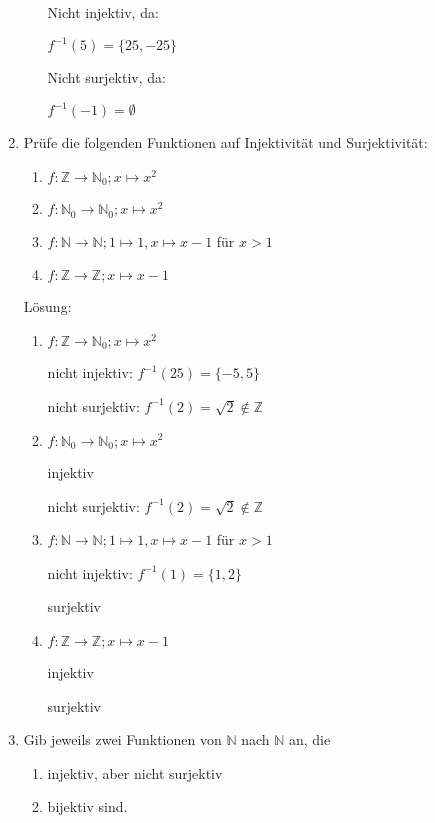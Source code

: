 \documentclass[main.tex]{subfiles}
\begin{document}
\begin{enumerate}
\begin{enumerate}
		            Nicht injektiv, da:

		            \( f^{-1}(5) = \{25, -25\} \)

		            Nicht surjektiv, da:

		            \( f^{-1}(-1) = \emptyset \)
	      \end{enumerate}
	\item Prüfe die folgenden Funktionen auf Injektivität und Surjektivität:
	      \begin{enumerate}
		      \item \( f: \mathbb{Z} \rightarrow \mathbb{N}_0 ; x \mapsto x^2 \)
		      \item \( f: \mathbb{N}_0 \rightarrow \mathbb{N}_0 ; x \mapsto x^2 \)
		      \item \( f: \mathbb{N} \rightarrow \mathbb{N}; 1 \mapsto 1, x \mapsto x - 1 \) für \( x > 1 \)
		      \item \( f: \mathbb{Z} \rightarrow \mathbb{Z}; x \mapsto x - 1 \)
	      \end{enumerate}

	      Lösung:
	      \begin{enumerate}
		      \item \( f: \mathbb{Z} \rightarrow \mathbb{N}_0 ; x \mapsto x^2 \)

		            nicht injektiv: \( f^{-1}(25) = \{-5, 5\} \)

		            nicht surjektiv: \( f^{-1}(2) = \sqrt{2} \notin \mathbb{Z} \)
		      \item \( f: \mathbb{N}_0 \rightarrow \mathbb{N}_0 ; x \mapsto x^2 \)

		            injektiv

		            nicht surjektiv: \( f^{-1}(2) = \sqrt{2} \notin \mathbb{Z} \)
		      \item \( f: \mathbb{N} \rightarrow \mathbb{N}; 1 \mapsto 1, x \mapsto x - 1 \) für \( x > 1 \)

		            nicht injektiv: \( f^{-1}(1) = \{1,2\} \)

		            surjektiv
		      \item \( f: \mathbb{Z} \rightarrow \mathbb{Z}; x \mapsto x - 1 \)

		            injektiv

		            surjektiv
	      \end{enumerate}
	\item Gib jeweils zwei Funktionen von \( \mathbb{N} \) nach \( \mathbb{N} \) an, die
	      \begin{enumerate}
		      \item injektiv, aber nicht surjektiv
		      \item bijektiv sind.
	      \end{enumerate}


\end{enumerate}
\end{document}
